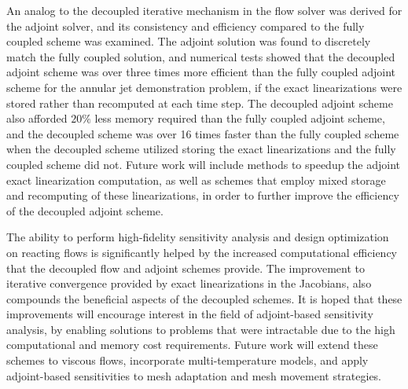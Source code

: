 An analog to the decoupled iterative mechanism in the flow solver was derived
for the adjoint solver, and its consistency and efficiency compared to the fully
coupled scheme was examined.  The adjoint solution was found to discretely match
the fully coupled solution, and numerical tests showed that the decoupled
adjoint scheme was over three times more efficient than the fully coupled
adjoint scheme for the annular jet demonstration problem, if the exact
linearizations were stored rather than recomputed at each time step.  The
decoupled adjoint scheme also afforded $20\%$ less memory required than the
fully coupled adjoint scheme, and the decoupled scheme was over 16 times faster
than the fully coupled scheme when the decoupled scheme utilized storing the
exact linearizations and the fully coupled scheme did not.  Future work will
include methods to speedup the adjoint exact linearization computation, as well
as schemes that employ mixed storage and recomputing of these linearizations,
in order to further improve the efficiency of the decoupled adjoint scheme.

The ability to perform high-fidelity sensitivity analysis and design
optimization on reacting flows is significantly helped by the increased
computational efficiency that the decoupled flow and adjoint schemes provide.
The improvement to iterative convergence provided by exact linearizations in the
Jacobians, also compounds the beneficial aspects of the decoupled schemes.  It
is hoped that these improvements will encourage interest in the field of
adjoint-based sensitivity analysis, by enabling solutions to problems that were
intractable due to the high computational and memory cost requirements.
Future work will extend these schemes to viscous flows, incorporate
multi-temperature models, and apply adjoint-based sensitivities to mesh
adaptation and mesh movement strategies.
